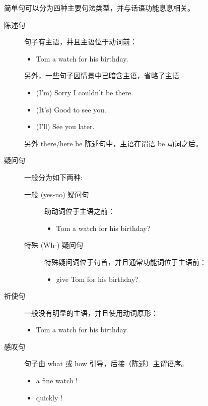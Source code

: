 简单句可以分为四种主要句法类型，并与话语功能息息相关。
\begin{description}
\item[陈述句] 句子有主语，并且主语位于动词前：
  \begin{itemize}
  \item {}  Tom a watch for his birthday.
  \end{itemize}

  另外，一些句子因情景中已暗含主语，省略了主语
  \begin{itemize}
  \item (I'm) Sorry I couldn't be there.

  \item (It's) Good to see you.
  \item (I'll) See you later.
  \end{itemize}

  另外 there/here be 陈述句中，主语在谓语 be 动词之后。

\item [疑问句] 一般分为如下两种:
  \begin{description}
  \item [一般 (yes-no) 疑问句] 助动词位于主语之前：
    \begin{itemize}
    \item {}   Tom a watch for his birthday?
    \end{itemize}

  \item [特殊 (Wh-) 疑问句] 特殊疑问词位于句首，并且通常功能词位于主语前：
    \begin{itemize}
    \item {}   give Tom for his birthday?
    \end{itemize}
  \end{description}

\item[祈使句] 一般没有明显的主语，并且使用动词原形：
  \begin{itemize}
  \item {} Tom a watch for his birthday.
  \end{itemize}


\item[感叹句] 句子由 what 或 how 引导，后接（陈述）主谓语序。
  \begin{itemize}
  \item {} a fine watch !

  \item {} quickly !
  \end{itemize}
\end{description}

